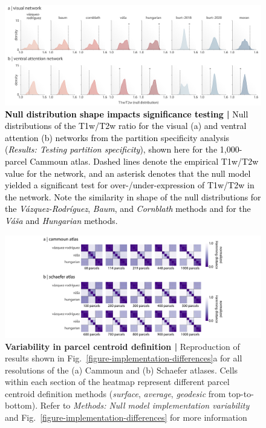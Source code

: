 \documentclass[12pt,aps,pra,reprint,showkeys]{revtex4-1}
\newcommand{\nimg}[1]{\textcolor{black}{{#1}}}
\begin{document}
\begin{figure}[htp]
  \begin{center}
    \centerline{\includegraphics[width=\textwidth]{hcp_null_examples.png}}
    \caption{
      \nimg{\textbf{Null distribution shape impacts significance testing |}
      Null distributions of the T1w/T2w ratio for the visual (a) and ventral attention (b) networks from the partition specificity analysis (\textit{Results: Testing partition specificity}), shown here for the 1,000-parcel Cammoun atlas.
      Dashed lines denote the empirical T1w/T2w value for the network, and an asterisk denotes that the null model yielded a significant test for over-/under-expression of T1w/T2w in the network.
      Note the similarity in shape of the null distributions for the \textit{V{\'a}zquez-Rodr{\'i}guez}, \textit{Baum}, and \textit{Cornblath} methods and for the \textit{V{\'a}{\v{s}}a} and \textit{Hungarian} methods.}
    }
    \label{supp-figure-hcp-nulls-example}
  \end{center}
\end{figure}

\begin{figure}[htp]
  \begin{center}
    \centerline{\includegraphics[width=\textwidth]{parcel_centroids.png}}
    \caption{
      \textbf{Variability in parcel centroid definition |}
      Reproduction of results shown in Fig.~\ref{figure-implementation-differences}a for all resolutions of the (a) Cammoun and (b) Schaefer atlases.
      Cells within each section of the heatmap represent different parcel centroid definition methods (\textit{surface}, \textit{average}, \textit{geodesic} from top-to-bottom).
      Refer to \textit{Methods: Null model implementation variability} and Fig.~\ref{figure-implementation-differences} for more information
    }
    \label{supp-figure-parcel-centroids}
  \end{center}
\end{figure}
\end{document}
